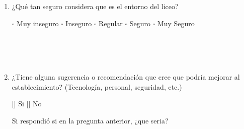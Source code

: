 \documentclass{article}
\begin{document}
\begin{enumerate}[leftmargin=*, label=\arabic*.]
    \item ¿Qué tan seguro considera que es el entorno del liceo? 
        \begin{center}
            $\square$ Muy inseguro \hspace{0.7cm} $\square$ Inseguro \hspace{0.7cm} $\square$ Regular \hspace{0.7cm} $\square$ Seguro \hspace{0.7cm} $\square$ Muy Seguro
        \end{center}
        \underline{\hspace{0.95\linewidth}} \vspace{0.3cm} \\
        \underline{\hspace{0.95\linewidth}} \vspace{0.3cm} \\
        \underline{\hspace{0.95\linewidth}} \vspace{0.3cm} \\

    \item ¿Tiene alguna sugerencia o recomendación que cree que podría mejorar al establecimiento? (Tecnología, personal, seguridad, etc.)
    \begin{center}
        [\hspace*{0.25cm}] Si \hspace{1cm} [\hspace*{0.25cm}] No
    \end{center}
    Si respondió si en la pregunta anterior, ¿que seria? \\[0.5cm]
        \underline{\hspace{0.95\linewidth}} \vspace{0.3cm} \\
        \underline{\hspace{0.95\linewidth}} \vspace{0.3cm} \\
        \underline{\hspace{0.95\linewidth}} \vspace{0.3cm}
\end{enumerate}
\end{document}

